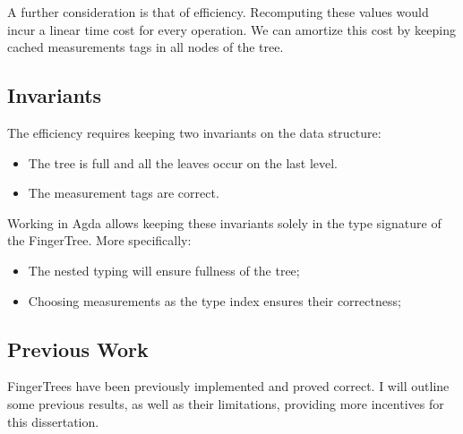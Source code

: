 \documentclass[12pt,twoside,notitlepage]{report}
\begin{document}
A further consideration is that of efficiency. Recomputing these values would incur a linear time cost for every operation. We can amortize this cost by keeping cached measurements tags in all nodes of the tree.

\subsection{Invariants}

The efficiency requires keeping two invariants on the data structure:
\begin{itemize}
	\item The tree is full and all the leaves occur on the last level. 
	\item The measurement tags are correct.
\end{itemize}

Working in Agda allows keeping these invariants solely in the type signature of the FingerTree. More specifically:
\begin{itemize}
	\item The nested typing will ensure fullness of the tree;
	\item Choosing measurements as the type index ensures their correctness;
\end{itemize} 

\subsection{Previous Work}

FingerTrees have been previously implemented and proved correct. I will outline some previous results, as well as their limitations, providing more incentives for this dissertation.
\end{document}
